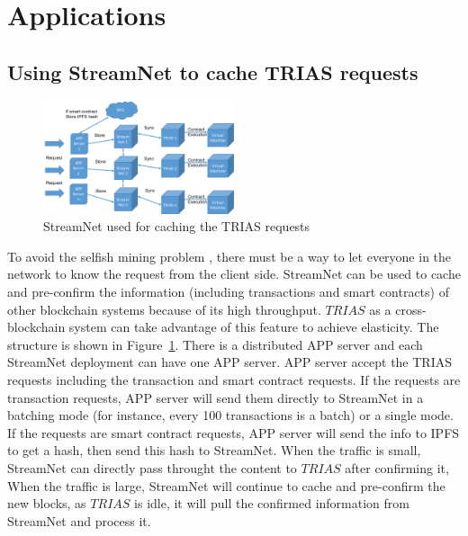 \section{Applications}

\subsection{Using StreamNet to cache TRIAS requests}

\begin{figure}[!ht]
        \begin{center}
                \includegraphics[width=0.50\textwidth]{figures/trias.pdf}
                \caption{StreamNet used for caching the TRIAS requests}
                \label{trias}
        \end{center}
\end{figure}

To avoid the selfish mining problem \cite{babaioff2012bitcoin, sapirshtein2016optimal}, there must be a way to let everyone in the network to know the request from the client side.
StreamNet can be used to cache and pre-confirm the information (including transactions and smart contracts) of other blockchain systems because of its high throughput.
$TRIAS$ \cite{trias18} as a cross-blockchain system can take advantage of this feature to achieve elasticity.
The structure is shown in Figure~\ref{trias}. 
There is a distributed APP server and each StreamNet deployment can have one APP server. 
APP server accept the TRIAS requests including the transaction and smart contract requests.
If the requests are transaction requests, APP server will send them directly to StreamNet in a batching mode (for instance, every 100 transactions is a batch) or a single mode.
If the requests are smart contract requests, APP server will send the info to IPFS to get a hash, then send this hash to StreamNet.
When the traffic is small, StreamNet can directly pass throught the content to $TRIAS$ after confirming it, 
When the traffic is large, StreamNet will continue to cache and pre-confirm the new blocks,
as $TRIAS$ is idle, it will pull the confirmed information from StreamNet and process it.

